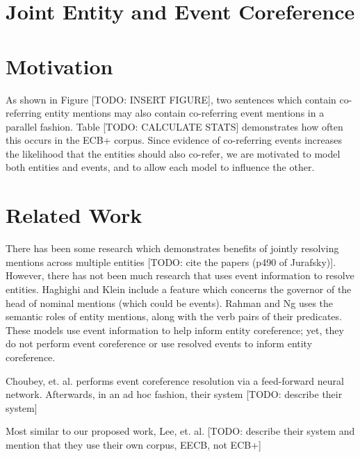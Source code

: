 \label{sec:proposed}
\section{Joint Entity and Event Coreference}
\section{Motivation}
As shown in Figure [TODO: INSERT FIGURE], two sentences which contain co-referring entity mentions may also contain co-referring event mentions in a parallel fashion.  Table [TODO: CALCULATE STATS] demonstrates how often this occurs in the ECB+ corpus.  Since evidence of co-referring events increases the likelihood that the entities should also co-refer, we are motivated to model both entities and events, and to allow each model to influence the other.

\section{Related Work}
There has been some research which demonstrates benefits of jointly resolving mentions across multiple entities [TODO: cite the papers (p490 of Jurafsky)].  However, there has not been much research that uses event information to resolve entities.  Haghighi and Klein \cite{Haghighi:2010:CRM:1857999.1858060} include a feature which concerns the governor of the head of nominal mentions (which could be events).  Rahman and Ng \cite{Rahman:2011:CRW:2002472.2002575} uses the semantic roles of entity mentions, along with the verb pairs of their predicates.  These models use event information to help inform entity coreference; yet, they do not perform event coreference or use resolved events to inform entity coreference.

Choubey, et. al. \cite{Choubey2017EventCR} performs event coreference resolution via a feed-forward neural network.  Afterwards, in an ad hoc fashion, their system [TODO: describe their system]

Most similar to our proposed work, Lee, et. al. \cite{Lee:2012:JEE:2390948.2391006} [TODO: describe their system and mention that they use their own corpus, EECB, not ECB+]

